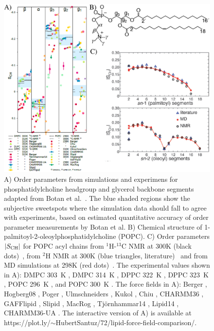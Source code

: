 \documentclass[aps,prl,superscriptaddress,twocolumn]{revtex4}
\begin{document}
\begin{figure}[]
  \includegraphics[width=17.2cm]{../Fig/allOPs.eps}
  \caption{\label{allOPs}
    A)  Order parameters from simulations and experimens for phosphatidylcholine headgroup and glycerol 
    backbone segments adapted from Botan et al.~\cite{botan15}. The blue shaded regions show the
    subjective sweetspots where the simulation data should fall to agree with experiments, 
    based on estimated quantitative accuracy of order parameter measurements by Botan et al.
    B) Chemical structure of 1-palmitoyl-2-oleoylphosphatidylcholine (POPC).
    C) Order parameters $|S_{{\rm CH}}|$ for POPC acyl chains 
    from $^1$H-$^{13}$C NMR at 300K (black dots)~\cite{ferreira13},
    from $^2$H NMR at 300K (blue triangles, literature)~\cite{seelig78,perly85} and 
    from MD simulations at 298K (red dots)~\cite{ferreira13}.
    The experimental values shown in A):
    DMPC 303~K \cite{gross97},
    DMPC 314~K \cite{dvinskikh05a},
    DPPC 322~K \cite{gally75},
    DPPC 323~K \cite{akutsu81},
    POPC 296~K \cite{bechinger91}, and
    POPC 300~K \cite{ferreira13}.
    The force fields in A):
    Berger \cite{berger97},
    Hogberg08 \cite{hogberg08},
    Poger \cite{poger10},
    Ulmschneiders \cite{ulmschneider09},
    Kukol \cite{kukol09},
    Chiu \cite{chiu09},
    CHARMM36 \cite{klauda10},
    GAFFlipid \cite{dickson12},
    Slipid \cite{jambeck12},
    MacRog \cite{maciejewski14},
    Tj{\"o}rnhammar14 \cite{tjornhammar14},
    Lipid14 \cite{dickson14},
    CHARMM36-UA \cite{lee14}. 
    The interactive version of A) is available at  https://plot.ly/$\sim$HubertSantuz/72/lipid-force-field-comparison/.   
  }
\end{figure}
\end{document}
